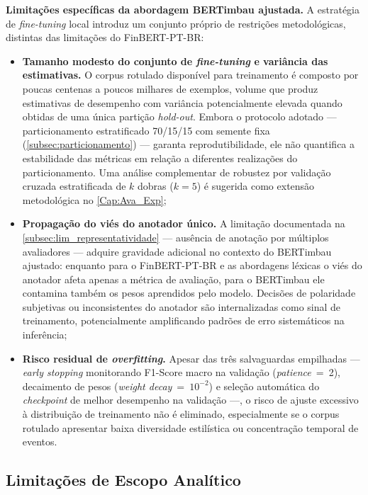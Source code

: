 \textbf{Limitações específicas da abordagem BERTimbau ajustada.} A estratégia de \textit{fine-tuning} local introduz um conjunto próprio de restrições metodológicas, distintas das limitações do FinBERT-PT-BR:

\begin{itemize}
	\item \textbf{Tamanho modesto do conjunto de \textit{fine-tuning} e variância das estimativas.} O corpus rotulado disponível para treinamento é composto por poucas centenas a poucos milhares de exemplos, volume que produz estimativas de desempenho com variância potencialmente elevada quando obtidas de uma única partição \textit{hold-out}. Embora o protocolo adotado --- particionamento estratificado 70/15/15 com semente fixa (\autoref{subsec:particionamento}) --- garanta reprodutibilidade, ele não quantifica a estabilidade das métricas em relação a diferentes realizações do particionamento. Uma análise complementar de robustez por validação cruzada estratificada de $k$ dobras ($k = 5$) é sugerida como extensão metodológica no \autoref{Cap:Ava_Exp};
	
	\item \textbf{Propagação do viés do anotador único.} A limitação documentada na \autoref{subsec:lim_representatividade} --- ausência de anotação por múltiplos avaliadores --- adquire gravidade adicional no contexto do BERTimbau ajustado: enquanto para o FinBERT-PT-BR e as abordagens léxicas o viés do anotador afeta apenas a métrica de avaliação, para o BERTimbau ele contamina também os pesos aprendidos pelo modelo. Decisões de polaridade subjetivas ou inconsistentes do anotador são internalizadas como sinal de treinamento, potencialmente amplificando padrões de erro sistemáticos na inferência;
	
	\item \textbf{Risco residual de \textit{overfitting}.} Apesar das três salvaguardas empilhadas --- \textit{early stopping} monitorando F1-Score macro na validação (\textit{patience}~=~2), decaimento de pesos (\textit{weight decay}~=~$10^{-2}$) e seleção automática do \textit{checkpoint} de melhor desempenho na validação ---, o risco de ajuste excessivo à distribuição de treinamento não é eliminado, especialmente se o corpus rotulado apresentar baixa diversidade estilística ou concentração temporal de eventos.
\end{itemize}

\subsection{Limitações de Escopo Analítico}
\label{subsec:lim_escopo}

